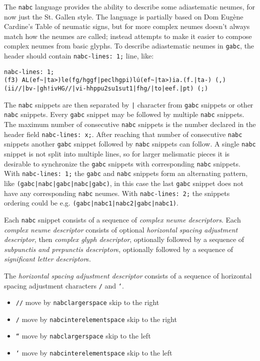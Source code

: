 \documentclass[a4paper]{article}
\begin{document}
{
\setlength\parindent{0cm}

The \texttt{nabc} language provides the ability to describe some adiastematic neumes, for
now just the St. Gallen style.  The language is partially based on Dom
Eugène Cardine's Table of neumatic signs, but for more complex neumes
doesn't always match how the neumes are called; instead attempts to make it
easier to compose complex neumes from basic glyphs.  To describe
adiastematic neumes in \texttt{gabc}, the header should contain
\texttt{nabc-lines: 1;} line, like:

\begin{verbatim}
nabc-lines: 1;
(f3) AL(ef~|ta>)le(fg/hggf|peclhgpi)lú(ef~|ta>)ia.(f.|ta-) (,)
(ii//|bv-|gh!ivHG//|vi-hhppu2su1sut1|fhg/|to|eef.|pt) (;)
\end{verbatim}

The \texttt{nabc} snippets are then separated by \texttt{|} character from
\texttt{gabc} snippets or other \texttt{nabc} snippets.  Every \texttt{gabc}
snippet may be followed by multiple \texttt{nabc} snippets.  The maximum
number of consecutive \texttt{nabc} snippets is the number declared in the
header field \texttt{nabc-lines: x;}.  After reaching that number of
consecutive \texttt{nabc} snippets another \texttt{gabc} snippet followed
by \texttt{nabc} snippets can follow.  A single \texttt{nabc} snippet is not
split into multiple lines, so for larger melismatic pieces it is desirable
to synchronize the \texttt{gabc} snippets with corresponding \texttt{nabc}
snippets.  With \texttt{nabc-lines: 1;} the
\texttt{gabc} and \texttt{nabc} snippets form an alternating pattern, like
\texttt{(gabc|nabc|gabc|nabc|gabc)}, in this case the last \texttt{gabc}
snippet does not have any corresponding \texttt{nabc} neumes.  With
\texttt{nabc-lines: 2;} the snippets ordering could be e.g.
\texttt{(gabc|nabc1|nabc2|gabc|nabc1)}.

Each \texttt{nabc} snippet consists of a sequence of \textit{complex neume
descriptors}.  Each \textit{complex neume descriptor} consists of
optional \textit{horizontal spacing adjustment descriptor}, then \textit{complex glyph
descriptor}, optionally followed by a sequence of \textit{subpunctis and prepunctis
descriptor}s, optionally followed by a sequence of \textit{significant letter
descriptor}s.

The \textit{horizontal spacing adjustment descriptor}
consists of a sequence of horizontal spacing adjustment characters
\texttt{/} and \texttt{`}.
\begin{itemize}
  \item \texttt{//} move by \texttt{nabclargerspace} skip to the right
  \item \texttt{/} move by \texttt{nabcinterelementspace} skip to the right
  \item \texttt{``} move by \texttt{nabclargerspace} skip to the left
  \item \texttt{`} move by \texttt{nabcinterelementspace} skip to the left
\end{itemize}

}
\end{document}
